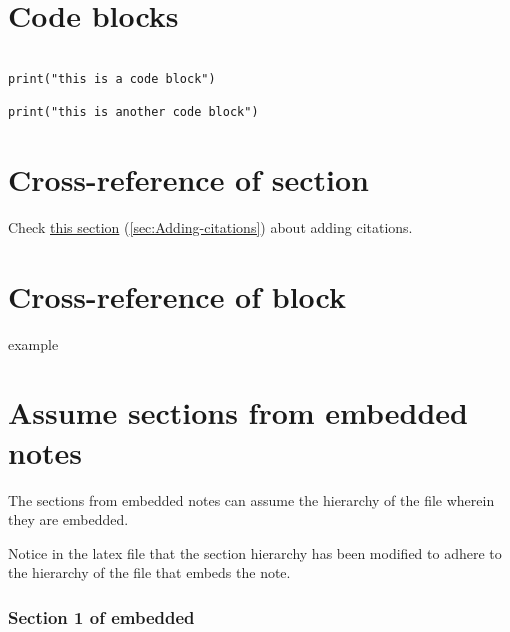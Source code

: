 \documentclass{extarticle}
\begin{document}
\section{Code blocks}

\begin{verbatim}

print("this is a code block")

print("this is another code block")

\end{verbatim}



\section{Cross-reference of section}

Check \hyperref[sec:Adding-citations]{this section} (\autoref{sec:Adding-citations}) about adding citations.





\section{\maltese Cross-reference of block}

example



\section{Assume sections from embedded notes}

The sections from embedded notes can assume the hierarchy of the file wherein they are embedded.

\begin{tcolorbox}[width=1.0\textwidth,colback={white},title={note},outer arc=0mm,colupper=black]

Notice in the latex file that the section hierarchy has been modified to adhere to the hierarchy of the file that embeds the note.

\end{tcolorbox}







\subsubsection{Section 1 of embedded}
\end{document}
